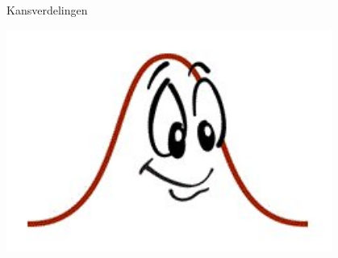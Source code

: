 \documentclass[a4paper,12pt, twoside]{article}
\begin{document}
\thispagestyle{empty}
\begin{center}
  \begin{mdframed}
  \centering
  \fontsize{40}{60}\selectfont Kansverdelingen
  \end{mdframed}
  \includegraphics[width=0.8\textwidth]{normal}
\end{center}
\vspace*{-2cm}
\end{document}
